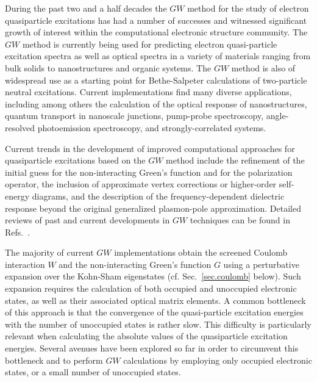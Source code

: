 \documentclass[twocolumn,prb,showpacs,superscriptaddress]{revtex4}
\begin{document}
During the past two and a half decades the $GW$ method\cite{hedin1,hl86}
for the study of electron quasiparticle excitations
has had a number of successes and witnessed significant growth of interest
within the computational electronic structure community.
The $GW$ method is currently being used for predicting electron quasi-particle
excitation spectra as well as optical spectra in a variety of materials
ranging from bulk solids to nanostructures and organic systems. The
$GW$ method is also of widespread use as a starting point for Bethe-Salpeter calculations
of two-particle neutral excitations.\cite{onida,bse1,bse2,bse3,rolfing,reining-review}
Current implementations find many diverse applications,
including among others the calculation of the optical response of nanostructures,\cite{catalin} quantum transport in nanoscale
junctions,\cite{rubio} pump-probe spectroscopy,\cite{catalin-lw} angle-resolved photoemission
spectroscopy,\cite{cheolhwan} and strongly-correlated systems.\cite{bruneval-oxide}

Current trends in the development of improved computational approaches for
quasiparticle excitations based on the $GW$ method include the refinement
of the initial guess for the non-interacting Green's function and for the
polarization operator,\cite{rinke,schilfegarde}
the inclusion of approximate vertex corrections or higher-order self-energy
diagrams,\cite{york} and the description of the frequency-dependent
dielectric response beyond the original generalized plasmon-pole approximation.\cite{spacetime,blochl}
Detailed reviews of past and current developments in $GW$ techniques can be
found in Refs.\ .

The majority of current $GW$ implementations obtain the screened Coulomb interaction
$W$ and the non-interacting Green's function $G$ using a perturbative
expansion over the Kohn-Sham eigenstates (cf. Sec.\ \ref{sec.coulomb} below). 
Such expansion requires the calculation of both occupied and unoccupied electronic states,
as well as their associated optical matrix elements.\cite{hl86} A common bottleneck 
of this approach is that the convergence of the quasi-particle excitation energies
with the number 
of unoccupied states is rather slow.\cite{sohrab} This difficulty is particularly relevant
when calculating the absolute values of the quasiparticle excitation energies.\cite{bruneval-gonze}
Several avenues have been explored so far in order to circumvent this bottleneck 
and to perform $GW$ calculations by employing only occupied electronic states,\cite{reining-sternheimer,umari1,umari2,gygi}
or a small number of unoccupied states.\cite{bruneval-gonze}
\end{document}
